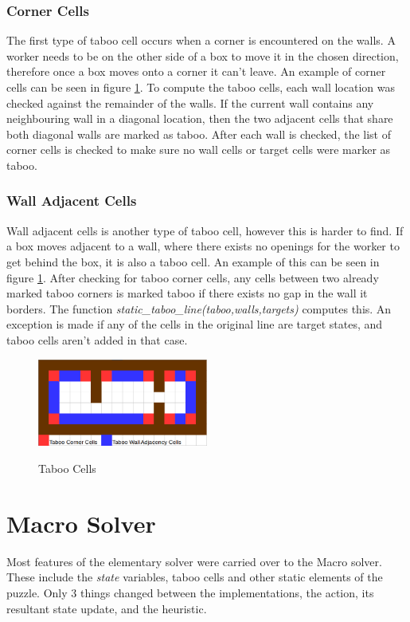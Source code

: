\documentclass[]{article}
\begin{document}
\subsubsection{Corner Cells}
 The first type of taboo cell occurs when a corner is encountered on the walls. A worker needs to be on the other side of a box to move it in the chosen direction, therefore once a box moves onto a corner it can't leave. An example of corner cells can be seen in figure \ref{TabooCells}. To compute the taboo cells, each wall location was checked against the remainder of the walls. If the current wall contains any neighbouring wall in a diagonal location, then the two adjacent cells that share both diagonal walls are marked as taboo. After each wall is checked, the list of corner cells is checked to make sure no wall cells or target cells were marker as taboo. 
\subsubsection{Wall Adjacent Cells}
Wall adjacent cells is another type of taboo cell, however this is harder to find. If a box moves adjacent to a wall, where there exists no openings for the worker to get behind the box, it is also a taboo cell. An example of this can be seen in figure \ref{TabooCells}. After checking for taboo corner cells, any cells between two already marked taboo corners is marked taboo if there exists no gap in the wall it borders. The function \textit{static\_taboo\_line(taboo,walls,targets)} computes this. An exception is made if any of the cells in the original line are target states, and taboo cells aren't added in that case. 
\begin{figure}[H]
	\centering
	\caption{Taboo Cells}
	\includegraphics[width=0.5\textwidth]{TabooCells.png}
	\label{TabooCells}
\end{figure}
\section{Macro Solver}
Most features of the elementary solver were carried over to the Macro solver. These include the \textit{state} variables, taboo cells and other static elements of the puzzle. Only 3 things changed between the implementations, the action, its resultant state update, and the heuristic.
\end{document}
